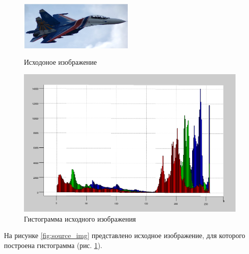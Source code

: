 \documentclass[a4paper,12pt,titlpage]{posobie}
\begin{document}
\begin{figure}[h]
 \parbox[h]{0.49\textwidth}{\centering
   \includegraphics[width=0.49\textwidth]{mig.png}
   \caption{Исходоное изображение}\label{fig:source_img}}
   \hfil\hfil%
   \begin{minipage}[h]{0.49\textwidth}
     \centering
     \includegraphics[width=\textwidth]{mig_gist.png}
     \caption{Гистограмма исходного изображения}\label{fig:source_img_gist}
   \end{minipage}
\end{figure}
     На рисунке \ref{fig:source_img} представлено исходное изображение, для которого построена гистограмма (рис. \ref{fig:source_img_gist}). 
\end{document}
